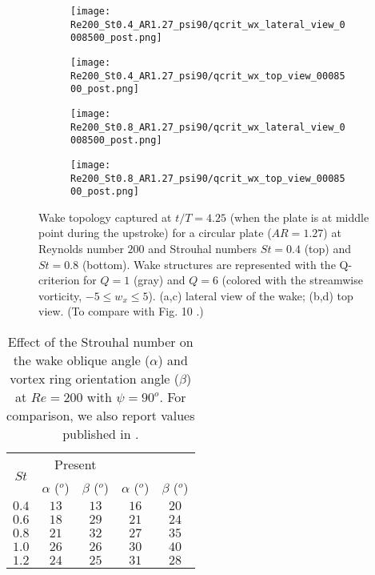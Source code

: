 \begin{figure}[!h]
  \centering
  \begin{subfigure}[]{0.45\textwidth}
    \centering
    \texttt{[image: Re200\_St0.4\_AR1.27\_psi90/qcrit\_wx\_lateral\_view\_0008500\_post.png]}
    \caption{}
    \label{fig:strouhal_wake_topology:0.4_lateral}
  \end{subfigure}
  \hfill
  \begin{subfigure}[]{0.45\textwidth}
    \centering
    \texttt{[image: Re200\_St0.4\_AR1.27\_psi90/qcrit\_wx\_top\_view\_0008500\_post.png]}
    \caption{}
    \label{fig:strouhal_wake_topology:0.4_top}
  \end{subfigure}
  \vspace{1cm}
  \begin{subfigure}[]{0.45\textwidth}
    \centering
    \texttt{[image: Re200\_St0.8\_AR1.27\_psi90/qcrit\_wx\_lateral\_view\_0008500\_post.png]}
    \caption{}
    \label{fig:strouhal_wake_topology:0.8_lateral}
  \end{subfigure}
  \hfill
  \begin{subfigure}[]{0.45\textwidth}
    \centering
    \texttt{[image: Re200\_St0.8\_AR1.27\_psi90/qcrit\_wx\_top\_view\_0008500\_post.png]}
    \caption{}
    \label{fig:strouhal_wake_topology:0.8_top}
  \end{subfigure}
  \caption{Wake topology captured at $t / T = 4.25$ (when the plate is at middle point during the upstroke) for a circular plate ($AR = 1.27$) at Reynolds number $200$ and Strouhal numbers $St = 0.4$ (top) and $St = 0.8$ (bottom). Wake structures are represented with the Q-criterion for $Q = 1$ (gray) and $Q = 6$ (colored with the streamwise vorticity, $-5 \leq w_x \leq 5$). (a,c) lateral view of the wake; (b,d) top view. (To compare with Fig. 10 \citet{li_dong_2016}.)}
  \label{fig:strouhal_wake_topology}
\end{figure}

\begin{table}[!h]
  \centering
  \begin{tabular}{ccccc}
    \hline\hline
    \multirow{2}{*}{$St$} &
      \multicolumn{2}{c}{Present} &
      \multicolumn{2}{c}{\citet{li_dong_2016}} \\
    & $\alpha$ ($^o$) & $\beta$ ($^o$) & $\alpha$ ($^o$) & $\beta$ ($^o$) \\
    \hline
    $0.4$ & $13$ & $13$ & $16$ & $20$ \\
    $0.6$ & $18$ & $29$ & $21$ & $24$ \\
    $0.8$ & $21$ & $32$ & $27$ & $35$ \\
    $1.0$ & $26$ & $26$ & $30$ & $40$ \\
    $1.2$ & $24$ & $25$ & $31$ & $28$ \\
    \hline\hline
  \end{tabular}
  \caption{Effect of the Strouhal number on the wake oblique angle ($\alpha$) and vortex ring orientation angle ($\beta$) at $Re = 200$ with $\psi = 90^o$. For comparison, we also report values published in \citet{li_dong_2016}.}
  \label{tab:strouhal_angles}
\end{table}

